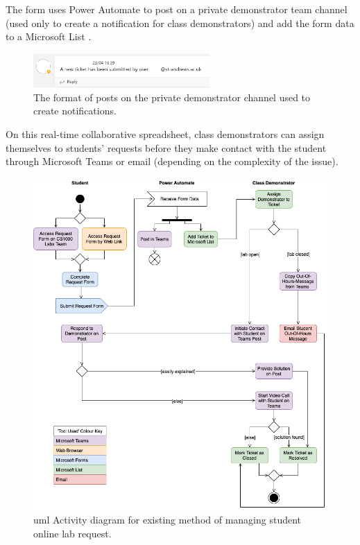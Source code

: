 The form uses Power Automate \cite{pauto} to post on a private demonstrator team channel (used only to create a notification for class demonstrators) and add the form data to a Microsoft List \cite{lists}.

\FloatBarrier
\begin{figure}[H]
  \centering
  \includegraphics[width=0.6\textwidth]{2context/images/teams2b.png}
  \caption{The format of posts on the private demonstrator channel used to create notifications.}
\end{figure}

On this real-time collaborative spreadsheet, class demonstrators can assign themselves to students' requests before they make contact with the student through Microsoft Teams \cite{teams} or email (depending on the complexity of the issue). 

\FloatBarrier
\begin{figure}[H]
  \centering
  \includegraphics[width=\textwidth]{2context/images/activityRevised.png}
  \caption{\gls{uml} Activity diagram for existing method of managing student online lab request.}
\end{figure}

